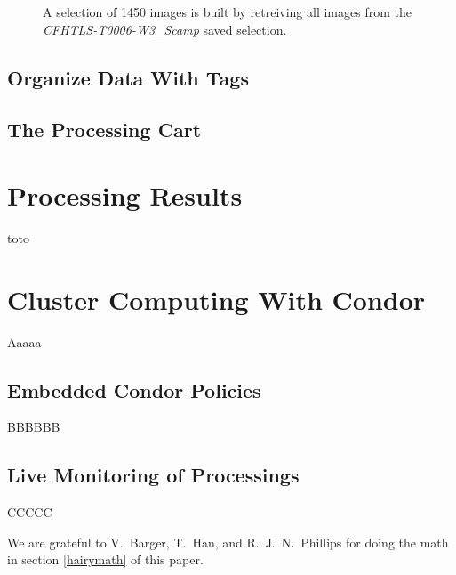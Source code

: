\documentclass[11pt,twoside]{article}  %
\begin{document}
\begin{figure}[h]
\caption{A selection of 1450 images is built by retreiving all images from the 
\emph{CFHTLS-T0006-W3\_Scamp} saved selection.}\label{fig:ims}
\end{figure}

\subsection{Organize Data With Tags}
\subsection{The Processing Cart}

\section{Processing Results}
toto
\section{Cluster Computing With Condor}
Aaaaa
\subsection{Embedded Condor Policies}
BBBBBB
\subsection{Live Monitoring of Processings}
CCCCC

\acknowledgments

We are grateful to V.\ Barger, T.\ Han, and R.~J.~N.\ Phillips for doing
the math in section \ref{hairymath} of this paper.
\end{document}
